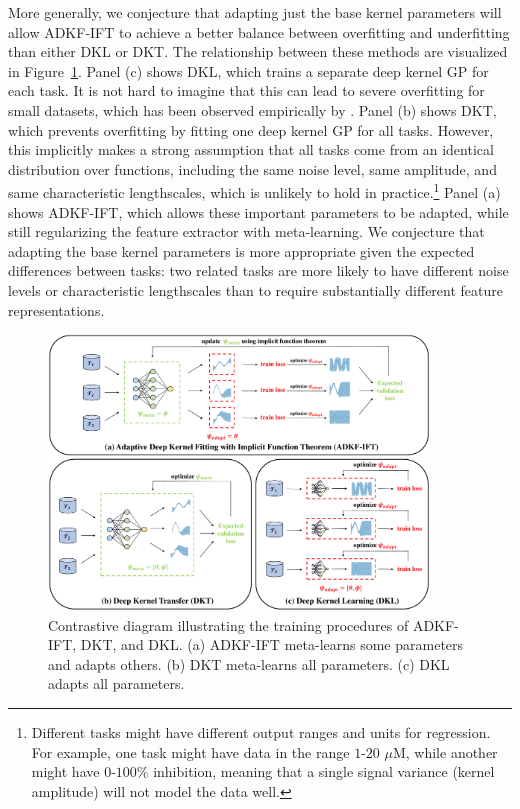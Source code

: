     More generally, we conjecture that adapting just the base kernel parameters will allow ADKF-IFT to achieve a better balance between overfitting and underfitting than either DKL or DKT.
    The relationship between these methods are visualized in Figure~\ref{fig:ADKF-IFT-illstration}.
    Panel (c) shows DKL, which trains a separate deep kernel GP for each task.
    It is not hard to imagine that this can lead to severe overfitting for small datasets,
    which has been observed empirically by \citet{ober21a}.
    Panel (b) shows DKT, which prevents overfitting by fitting one deep kernel GP for all tasks.
    However, this implicitly makes a strong assumption that all tasks come from an identical distribution over functions,
    including the same noise level, same amplitude, and same characteristic lengthscales, which is unlikely to hold in practice.\footnote{
        Different tasks might have different 
        output ranges and units for regression.
        For example, one task might have data in the range $1$-$20$ $\mu$M,
        while another might have $0$-$100\%$ inhibition, meaning that a single signal variance
        (kernel amplitude) will not model the data well.
    }
    Panel (a) shows ADKF-IFT, which allows these important parameters to be adapted, while still regularizing the feature extractor
    with meta-learning. We conjecture that adapting the base kernel parameters is more appropriate given the expected differences
    between tasks:
    two related tasks are more likely to have different noise levels
    or characteristic lengthscales than to require substantially different feature representations.
    
    \begin{figure}[htb]
        \centering
        \includegraphics[width=0.9\textwidth]{illustration.pdf}
        \caption[Diagram illustrating the training procedures of ADKF-IFT, DKT, and DKL.]{
            Contrastive diagram illustrating the training procedures of ADKF-IFT, DKT, and DKL.
            (a) ADKF-IFT meta-learns some parameters and adapts others.
            (b) DKT meta-learns all parameters.
            (c) DKL adapts all parameters.
        }
        \label{fig:ADKF-IFT-illstration}
    \end{figure}

